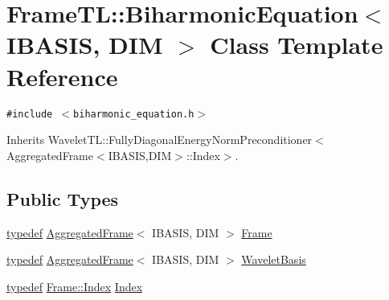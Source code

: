 \hypertarget{classFrameTL_1_1BiharmonicEquation}{
\section{FrameTL::BiharmonicEquation$<$ IBASIS, DIM $>$ Class Template Reference}
\label{classFrameTL_1_1BiharmonicEquation}
}
{\tt \#include $<$biharmonic\_\-equation.h$>$}

Inherits WaveletTL::FullyDiagonalEnergyNormPreconditioner$<$AggregatedFrame$<$IBASIS,DIM$>$::Index$>$.

\subsection*{Public Types}
\begin{CompactItemize}
\item 
\hyperlink{structtypedef}{typedef} \hyperlink{classFrameTL_1_1AggregatedFrame}{AggregatedFrame}$<$ IBASIS, DIM $>$ \hyperlink{classFrameTL_1_1BiharmonicEquation_a6589dcf7cfc46ba411c3f35146e1a5d}{Frame}
\item 
\hyperlink{structtypedef}{typedef} \hyperlink{classFrameTL_1_1AggregatedFrame}{AggregatedFrame}$<$ IBASIS, DIM $>$ \hyperlink{classFrameTL_1_1BiharmonicEquation_2c96ea759f7da9b09717e9a68eb49a6f}{WaveletBasis}
\item 
\hyperlink{structtypedef}{typedef} \hyperlink{classFrameTL_1_1FrameIndex}{Frame::Index} \hyperlink{classFrameTL_1_1BiharmonicEquation_3092eb11291bea911cf17d1de560bc1e}{Index}
\end{CompactItemize}
